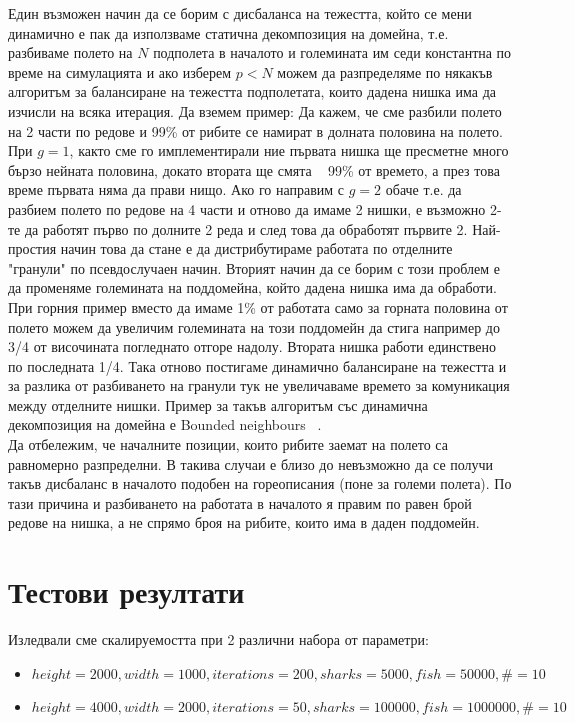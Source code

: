 \documentclass[12pt]{article}
\begin{document}
Един възможен начин да се борим с дисбаланса на тежестта, който се мени динамично е пак да използваме статична декомпозиция на домейна,
т.е. разбиваме полето на $N$ подполета в началото и големината им седи константна по време на симулацията и ако изберем $p < N$ можем да разпределяме
по някакъв алгоритъм за балансиране на тежестта подполетата, които дадена нишка има да изчисли на всяка итерация.
Да вземем пример: Да кажем, че сме разбили полето на 2 части по редове и 99\% от рибите се намират в долната половина
на полето. При $g = 1$, както сме го имплементирали ние първата нишка ще пресметне много бързо нейната половина, докато
втората ще смята ~ 99\% от времето, а през това време първата няма да прави нищо. Ако го направим с $g = 2$ обаче
т.е. да разбием полето по редове на 4 части и отново да имаме 2 нишки, е възможно 2-те да работят първо по долните 2
реда и след това да обработят първите 2. Най-простия начин това да стане е да дистрибутираме
работата по отделните "гранули" по псевдослучаен начин. Вторият начин да се борим с този проблем е да променяме големината
на поддомейна, който дадена нишка има да обработи. При горния пример вместо да имаме 1\% от работата само за
горната половина от полето можем да увеличим големината на този поддомейн да стига например до 3/4 от височината погледнато
отгоре надолу. Втората нишка работи единствено по последната 1/4. Така отново постигаме динамично балансиране на тежестта и за разлика
от разбиването на гранули тук не увеличаваме времето за комуникация между отделните нишки.
Пример за такъв алгоритъм със динамична декомпозиция на домейна е Bounded neighbours ~\cite{bounded_neighbours}.
\\
Да отбележим, че началните позиции, които рибите заемат на полето са равномерно разпределни. В такива случаи е близо до
невъзможно да се получи такъв дисбаланс в началото подобен на гореописания (поне за големи полета). По тази причина
и разбиването на работата в началото я правим по равен брой редове на нишка, а не спрямо броя на рибите, които има в даден
поддомейн.
\\

\section{Тестови резултати}

\bigbreak
Изледвали сме скалируемостта при 2 различни набора от параметри:
\begin{itemize}
	\item $height = 2000, width = 1000, iterations = 200, sharks = 5000, fish = 50 000, \# = 10$
	\item $height = 4000, width = 2000, iterations = 50, sharks = 100 000, fish = 1 000 000, \# = 10$
\end{itemize}
\end{document}
